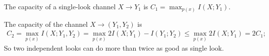 \documentclass[10pt]{article}
\begin{document}
\begin{tiny}
\begin{multicols}{3}
The capacity of a single-look channel $X\rightarrow Y_1$ is $C_1 = \max_{p(x)} I(X;Y_1)$.

The capacity of the channel $X \rightarrow (Y_1,Y_2)$ is 
\begin{align*}
    C_2 = \max_{p(x)}I(X;Y_1,Y_2) 
    = \max_{p(x)} 2I(X;Y_1) -I(Y_1; Y_2) 
    \le \max_{p(x)}2I(X;Y_1) = 2C_1;
\end{align*}
So two independent looks can do more than twice as good as single look.



\end{multicols}
\end{tiny}
\end{document}
